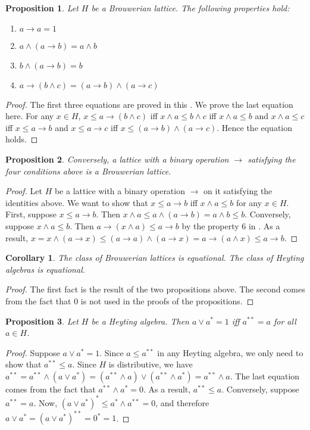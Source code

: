 \documentclass[12pt]{article}
\newtheorem{prop}{Proposition}
\newtheorem{cor}{Corollary}
\begin{document}
\begin{prop} Let $H$ be a Brouwerian lattice.  The following properties hold:
\begin{enumerate}
\item $a\to a = 1$
\item $a\wedge (a\to b)=a\wedge b$
\item $b\wedge (a\to b)=b$
\item $a\to (b\wedge c) = (a\to b)\wedge (a\to c)$
\end{enumerate}
\end{prop}
\begin{proof}  The first three equations are proved in this .  We prove the last equation here.  For any $x\in H$, $x\le a\to (b\wedge c)$ iff $x\wedge a \le b\wedge c$ iff $x\wedge a\le b$ and $x\wedge a \le c$ iff $x\le a\to b$ and $x\le a\to c$ iff $x\le (a\to b)\wedge (a\to c)$.  Hence the equation holds.
\end{proof}

\begin{prop} Conversely, a lattice with a binary operation $\to$ satisfying the four conditions above is a Brouwerian lattice. \end{prop}
\begin{proof}  Let $H$ be a lattice with a binary operation $\to$ on it satisfying the identities above.  We want to show that $x\le a\to b$ iff $x\wedge a \le b$ for any $x\in H$.  First, suppose $x\le a\to b$.  Then $x\wedge a \le a\wedge (a\to b) = a\wedge b \le b$.  Conversely, suppose $x\wedge a \le b$.  Then $a\to (x\wedge a) \le a\to b$ by the property 6 in .  As a result, $x=x\wedge (a\to x) \le (a\to a)\wedge (a\to x) = a\to (a\wedge x) \le a\to b$.
\end{proof}

\begin{cor} The class of Brouwerian lattices is equational.  The class of Heyting algebras is equational.  \end{cor}
\begin{proof}  The first fact is the result of the two propositions above.  The second comes from the fact that $0$ is not used in the proofs of the propositions.
\end{proof}

\begin{prop} Let $H$ be a Heyting algebra.  Then $a\vee a^* = 1$ iff $a^{**}=a$ for all $a\in H$. \end{prop}
\begin{proof}  Suppose $a\vee a^*=1$.  Since $a\le a^{**}$ in any Heyting algebra, we only need to show that $a^{**} \le a$.  Since $H$ is distributive, we have $a^{**}=a^{**}\wedge (a\vee a^*)= (a^{**}\wedge a)\vee (a^{**}\wedge a^*) =a^{**}\wedge a$.  The last equation comes from the fact that $a^{**}\wedge a^*=0$.  As a result, $a^{**}\le a$.  Conversely, suppose $a^{**} = a$. Now, $(a\vee a^*)^* \le a^* \wedge a^{**}=0$, and therefore $a\vee a^* = (a\vee a^*)^{**} = 0^* = 1$.
\end{proof}
\end{document}
